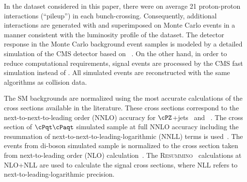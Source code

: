 In the dataset considered in this paper,
there were on average 21 proton-proton interactions (``pileup'') in each bunch-crossing.
Consequently, additional interactions are generated with \PYTHIA and superimposed on Monte Carlo events in a manner consistent with the
luminosity profile of the dataset.
The detector response in the Monte Carlo background event samples is modeled by a
detailed simulation
of the CMS detector based on {\GEANTfour}~\cite{Agostinelli:2002hh}.  
On the other hand, in order to reduce  computational requirements, signal events 
are processed by the CMS fast simulation \cite{Abdullin:2011zz} instead of {\GEANTfour}. 
All simulated events are reconstructed with the same algorithms as collision data.

The SM backgrounds are normalized using the most accurate calculations of the cross sections available 
in the literature. These cross sections correspond to the next-to-next-to-leading order (NNLO) accuracy for $\cPZ$+jets~\cite{Melnikov:2006kv} 
and \wjets~\cite{xsec_WZ}. The cross section of $\cPqt\cPaqt$ simulated sample at full NNLO accuracy including the resummation of 
next-to-next-to-leading-logarithmic (NNLL) terms is used~\cite{Czakon:2011xx}. The events from di-boson simulated sample is normalized to the 
cross section taken from next-to-leading order (NLO) calculation~\cite{Campbell:2011bn}.
The \textsc{Resummino}~\cite{Fuks:2012qx,Fuks:2013vua,Fuks:2013lya} calculations at NLO+NLL are used to calculate the signal cross sections, where 
NLL refers to next-to-leading-logarithmic precision.


